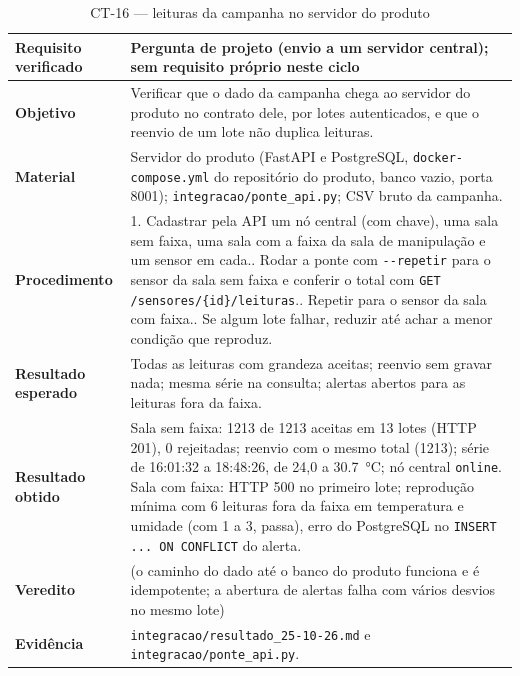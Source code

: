 \begin{table}[H]
\centering
\caption{CT-16 --- leituras da campanha no servidor do produto}
\label{tab:ct16}
\footnotesize
\setlength{\tabcolsep}{3.5pt}
\begin{tabular}{@{}L{3.2cm}L{12.0cm}@{}}
\toprule
\textbf{Requisito verificado} & Pergunta de projeto (envio a um servidor central); sem requisito próprio neste ciclo \\
\midrule
\textbf{Objetivo} & Verificar que o dado da campanha chega ao servidor do produto no contrato dele, por lotes autenticados, e que o reenvio de um lote não duplica leituras. \\
\textbf{Material} & Servidor do produto (FastAPI e PostgreSQL, \texttt{docker-compose.yml} do repositório do produto, banco vazio, porta 8001); \texttt{integracao/ponte\_api.py}; CSV bruto da campanha. \\
\textbf{Procedimento} &
  1. Cadastrar pela API um nó central (com chave), uma sala sem faixa, uma sala com a faixa da sala de manipulação e um sensor em cada.. Rodar a ponte com \texttt{-{}-repetir} para o sensor da sala sem faixa e conferir o total com \texttt{GET /sensores/\{id\}/leituras}.. Repetir para o sensor da sala com faixa.. Se algum lote falhar, reduzir até achar a menor condição que reproduz. \\
\textbf{Resultado esperado} & Todas as leituras com grandeza aceitas; reenvio sem gravar nada; mesma série na consulta; alertas abertos para as leituras fora da faixa. \\
\textbf{Resultado obtido} & Sala sem faixa: \num{1213} de \num{1213} aceitas em 13 lotes (HTTP 201), 0 rejeitadas; reenvio com o mesmo total (\num{1213}); série de 16:01:32 a 18:48:26, de 24,0 a \SI{30,7}{\celsius}; nó central \texttt{online}. Sala com faixa: HTTP 500 no primeiro lote; reprodução mínima com 6 leituras fora da faixa em temperatura e umidade (com 1 a 3, passa), erro do PostgreSQL no \texttt{INSERT ... ON CONFLICT} do alerta. \\
\textbf{Veredito} & \parcial{} (o caminho do dado até o banco do produto funciona e é idempotente; a abertura de alertas falha com vários desvios no mesmo lote) \\
\textbf{Evidência} & \texttt{integracao/resultado\_25-10-26.md} e \texttt{integracao/ponte\_api.py}. \\
\bottomrule
\end{tabular}
\end{table}

